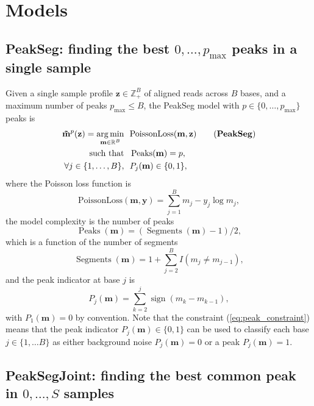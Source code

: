 \documentclass{article} %
\DeclareMathOperator*{\argmin}{arg\,min}
\DeclareMathOperator*{\Peaks}{Peaks}
\DeclareMathOperator*{\Segments}{Segments}
\newcommand{\sign}{\operatorname{sign}}
\newcommand{\RR}{\mathbb R}
\newcommand{\ZZ}{\mathbb Z}
\begin{document}
\section{Models}

\subsection{PeakSeg: finding the best $0,\dots,p_{\text{max}}$ peaks
  in a single sample}

Given a single sample profile $\mathbf z\in\ZZ_+^B$ of aligned reads
across $B$ bases, and a maximum number of peaks $p_{\text{max}}\leq
B$, the PeakSeg model with $p\in\{0, \dots, p_{\text{max}}\}$ peaks is
\begin{align}
  \label{PeakSeg}
  \mathbf{\tilde m}^p(\mathbf z)  =
    \argmin_{\mathbf m\in\RR^{B}} &\ \ 
    \text{PoissonLoss}(\mathbf m, \mathbf z) 
    \tag{\textbf{PeakSeg}}
\\
    \text{such that} &\ \  \Peaks(\mathbf m)=p,  \\
     \forall j\in\{1, \dots, B\}, &\ \ P_j(\mathbf m) \in\{0, 1\},
    \label{eq:peak_constraint}
\end{align}
where the Poisson loss function is
\begin{equation}\label{eq:rho}
  \text{PoissonLoss}(\mathbf m, \mathbf y)= \sum_{j=1}^B m_j - y_j \log m_j,
\end{equation} 
the model complexity is the number of peaks
\begin{equation}
  \Peaks(\mathbf m)=(\Segments(\mathbf m)-1)/2,
\end{equation}
which is a function of the number of segments
\begin{equation}
  \Segments(\mathbf m)=1+\sum_{j=2}^B I(m_j \neq m_{j-1}),
\end{equation}
and the peak indicator at base $j$ is
\begin{equation}
  \label{eq:peaks}
  P_j(\mathbf m) = \sum_{k=2}^j \sign( m_{k} - m_{k-1} ),
\end{equation}
with $P_1(\mathbf m)=0$ by convention. Note that the constraint
(\ref{eq:peak_constraint}) means that the peak indicator $P_j(\mathbf
m)\in\{0, 1\}$ can be used to classify each base $j\in\{1,\dots B\}$
as either background noise $P_j(\mathbf m)=0$ or a peak $P_j(\mathbf
m)=1$.

\subsection{PeakSegJoint: finding the best common peak in $0,\dots, S$
  samples}
\end{document}
